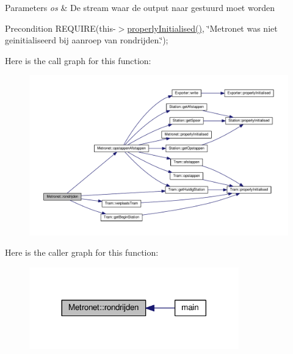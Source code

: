 \begin{DoxyParams}{Parameters}
{\em os} & De stream waar de output naar gestuurd moet worden \\
\hline
\end{DoxyParams}
\begin{DoxyPrecond}{Precondition}
R\+E\+Q\+U\+I\+RE(this-\/$>$\hyperlink{class_metronet_a3d2adce29a947f162924279b766de645}{properly\+Initialised()}, \char`\"{}\+Metronet was niet geinitialiseerd bij aanroep van rondrijden.\char`\"{}); 
\end{DoxyPrecond}
Here is the call graph for this function\+:\nopagebreak
\begin{figure}[H]
\begin{center}
\leavevmode
\includegraphics[width=350pt]{class_metronet_a180b666c7d4cc52f873579ab7f95ea35_cgraph}
\end{center}
\end{figure}
Here is the caller graph for this function\+:\nopagebreak
\begin{figure}[H]
\begin{center}
\leavevmode
\includegraphics[width=257pt]{class_metronet_a180b666c7d4cc52f873579ab7f95ea35_icgraph}
\end{center}
\end{figure}
\mbox{\label{class_metronet_ad12d6e52c7f5c23d23e87992b4abc1fa}} 
